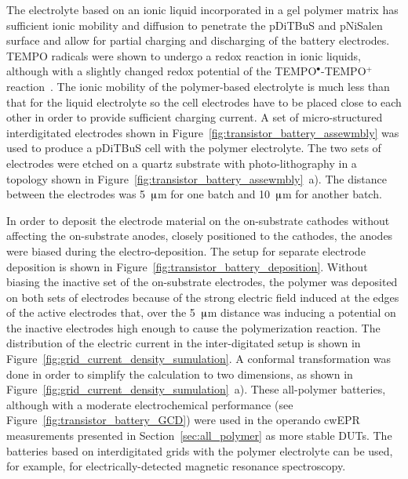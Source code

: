 The electrolyte based on an ionic liquid incorporated in a gel polymer matrix has sufficient ionic mobility and diffusion to penetrate the pDiTBuS and pNiSalen surface and allow for partial charging and discharging of the battery electrodes. TEMPO radicals were shown to undergo a redox reaction in ionic liquids, although with a slightly changed redox potential of the TEMPO$^{\bullet}$-TEMPO$^+$ reaction~\cite{Golovisnina2023}. The ionic mobility of the polymer-based electrolyte is much less than that for the liquid electrolyte so the cell electrodes have to be placed close to each other in order to provide sufficient charging current. A set of micro-structured interdigitated electrodes shown in Figure~\ref{fig:transistor_battery_assewmbly} was used to produce a pDiTBuS cell with the polymer electrolyte. The two sets of electrodes were etched on a quartz substrate with photo-lithography in a topology shown in Figure~\ref{fig:transistor_battery_assewmbly}~a). The distance between the electrodes was 5~$\muup$m for one batch and 10~$\muup$m for another batch.\\
\par
In order to deposit the electrode material on the on-substrate cathodes without affecting the on-substrate anodes, closely positioned to the cathodes, the anodes were biased during the electro-deposition. The setup for separate electrode deposition is shown in Figure~\ref{fig:transistor_battery_deposition}. Without biasing the inactive set of the on-substrate electrodes, the polymer was deposited on both sets of electrodes because of the strong electric field induced at the edges of the active electrodes that, over the 5~$\muup$m distance was inducing a potential on the inactive electrodes high enough to cause the polymerization reaction. The distribution of the electric current in the inter-digitated setup is shown in Figure~\ref{fig:grid_current_density_sumulation}. A conformal transformation was done in order to simplify the calculation to two dimensions, as shown in Figure~\ref{fig:grid_current_density_sumulation}~a). These all-polymer batteries, although with a moderate electrochemical performance (see Figure~\ref{fig:transistor_battery_GCD}) were used in the operando cwEPR measurements presented in Section~\ref{sec:all_polymer} as more stable DUTs. The batteries based on interdigitated grids with the polymer electrolyte can be used, for example, for electrically-detected magnetic resonance spectroscopy.\\


